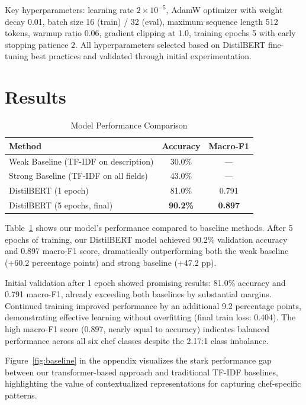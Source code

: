 \documentclass[twocolumn,10pt]{article}
\begin{document}
Key hyperparameters: learning rate $2 \times 10^{-5}$, AdamW optimizer with weight decay 0.01, batch size 16 (train) / 32 (eval), maximum sequence length 512 tokens, warmup ratio 0.06, gradient clipping at 1.0, training epochs 5 with early stopping patience 2. All hyperparameters selected based on DistilBERT fine-tuning best practices and validated through initial experimentation.

\section{Results}

\begin{table}[h]
\centering
\caption{Model Performance Comparison}
\begin{tabular}{lcc}
\hline
\textbf{Method} & \textbf{Accuracy} & \textbf{Macro-F1} \\
\hline
Weak Baseline (TF-IDF on description) & 30.0\% & --- \\
Strong Baseline (TF-IDF on all fields) & 43.0\% & --- \\
\hline
DistilBERT (1 epoch) & 81.0\% & 0.791 \\
DistilBERT (5 epochs, final) & \textbf{90.2\%} & \textbf{0.897} \\
\hline
\end{tabular}
\label{tab:results}
\end{table}

Table~\ref{tab:results} shows our model's performance compared to baseline methods. After 5 epochs of training, our DistilBERT model achieved 90.2\% validation accuracy and 0.897 macro-F1 score, dramatically outperforming both the weak baseline (+60.2 percentage points) and strong baseline (+47.2 pp).

Initial validation after 1 epoch showed promising results: 81.0\% accuracy and 0.791 macro-F1, already exceeding both baselines by substantial margins. Continued training improved performance by an additional 9.2 percentage points, demonstrating effective learning without overfitting (final train loss: 0.404). The high macro-F1 score (0.897, nearly equal to accuracy) indicates balanced performance across all six chef classes despite the 2.17:1 class imbalance.

Figure~\ref{fig:baseline} in the appendix visualizes the stark performance gap between our transformer-based approach and traditional TF-IDF baselines, highlighting the value of contextualized representations for capturing chef-specific patterns.
\end{document}
